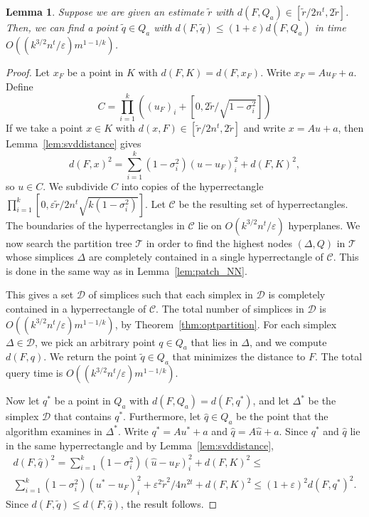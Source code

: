 \documentclass[a4paper,11pt]{paper}
\newcommand{\eps}{\varepsilon}
\newtheorem{lemma}[theorem]{Lemma}
\begin{document}
\begin{lemma}\label{lem:farNNinQa}
  Suppose we are given an estimate $\widetilde{r}$
  with $d(F, Q_a) \in [\widetilde{r}/2n^{t}, 2\widetilde{r}]$.
  Then, we can find a point $\widetilde{q} \in Q_a$ with
  $d(F, \widetilde{q}) \leq (1 + \eps)d(F, Q_a)$ in
  time $O((k^{3/2}n^{t}/\eps)m^{1-1/k})$.
\end{lemma}
\begin{proof}
Let $x_F$ be a point in $K$ with
$d(F, K) = d(F, x_F)$. Write $x_F = Au_F + a$.
Define
\[
  C = \prod_{i = 1}^k \left((u_F)_i  +
    \left[0,
  2\widetilde{r}/\sqrt{1-\sigma_i^2}\right]\right)
\]
If we take a point $x \in K$ with
$d(x, F) \in [\widetilde{r}/2n^{t}, 2\widetilde{r}]$ and write
$x = Au + a$, then Lemma~\ref{lem:svddistance} gives
\[
  d(F, x)^2 =
    \sum_{i = 1}^k(1-\sigma_i^2)(u - u_F)_i^2 +
         d(F, K)^2,
\]
so  $u \in C$.
We subdivide $C$ into copies of the
hyperrectangle
$\prod_{i = 1}^k[0, \eps\widetilde{r}/2n^t\sqrt{k(1-\sigma_i^2)}]$.
Let $\mathcal{C}$ be the resulting set of hyperrectangles.
The boundaries of the hyperrectangles in $\mathcal{C}$ lie on
$O(k^{3/2}n^{t}/\eps)$ hyperplanes.
We now search the partition tree $\mathcal{T}$
in order to find the highest nodes $(\Delta, Q)$ in
$\mathcal{T}$  whose simplices $\Delta$ are completely contained
in a single hyperrectangle of $\mathcal{C}$.
This is done in the same way as in Lemma~\ref{lem:patch_NN}.

This gives a set $\mathcal{D}$ of simplices
such that each simplex in $\mathcal{D}$ is completely contained in
a hyperrectangle of $\mathcal{C}$.
The total number of simplices
in $\mathcal{D}$ is $O((k^{3/2}n^{t}/\eps)m^{1-1/k})$, by
Theorem~\ref{thm:optpartition}.
For each simplex $\Delta \in \mathcal{D}$,
we pick an arbitrary point $q \in Q_a$ that lies in
$\Delta$, and we compute $d(F, q)$. We return
the point $\widetilde{q} \in Q_a$ that minimizes the
distance to $F$.
The total query time is $O((k^{3/2}n^{t}/\eps)m^{1-1/k})$.

Now let $q^*$ be a point in $Q_a$ with $d(F, Q_a) = d(F, q^*)$,
and let $\Delta^*$ be the simplex $\mathcal{D}$ that contains $q^*$.
Furthermore, let $\widehat{q} \in Q_a$ be the point that the algorithm
examines in $\Delta^*$. Write $q^* = Au^* + a$ and
$\widehat{q} = A\widehat{u} + a$. Since
$q^*$ and $\widehat{q}$ lie in the same hyperrectangle and by
Lemma~\ref{lem:svddistance},
  \begin{multline*}
  d(F, \widehat{q})^2 =
    \sum_{i = 1}^k(1-\sigma_i^2)(\widehat{u} - u_F)_i^2 + d(F, K)^2
  \leq\\ \sum_{i = 1}^k(1-\sigma_i^2)(u^* - u_F)_i^2 +
  \eps^2\widetilde{r}^2/4n^{2t} +
  d(F, K)^2 \leq
   (1+\eps)^2d(F, q^*)^2.
\end{multline*}
Since $d(F, \widetilde{q}) \leq d(F, \widehat{q})$, the result
follows.
\end{proof}
\end{document}
